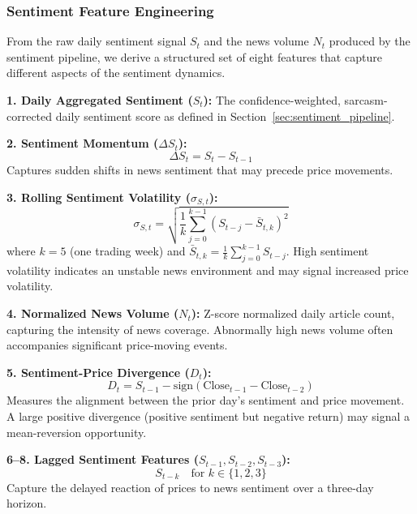 \documentclass[12pt,a4paper]{article}
\begin{document}
\subsubsection{Sentiment Feature Engineering}
\label{sec:sentiment_features}

From the raw daily sentiment signal $S_t$ and the news volume $N_t$ produced by the sentiment pipeline, we derive a structured set of eight features that capture different aspects of the sentiment dynamics.

\textbf{1. Daily Aggregated Sentiment ($S_t$):}
The confidence-weighted, sarcasm-corrected daily sentiment score as defined in Section~\ref{sec:sentiment_pipeline}.

\textbf{2. Sentiment Momentum ($\Delta S_t$):}
\begin{equation}
\Delta S_t = S_t - S_{t-1}
\end{equation}
Captures sudden shifts in news sentiment that may precede price movements.

\textbf{3. Rolling Sentiment Volatility ($\sigma_{S,t}$):}
\begin{equation}
\sigma_{S,t} = \sqrt{\frac{1}{k} \sum_{j=0}^{k-1} \left(S_{t-j} - \bar{S}_{t,k}\right)^2}
\end{equation}
where $k = 5$ (one trading week) and $\bar{S}_{t,k} = \frac{1}{k}\sum_{j=0}^{k-1} S_{t-j}$. High sentiment volatility indicates an unstable news environment and may signal increased price volatility.

\textbf{4. Normalized News Volume ($N_t$):}
Z-score normalized daily article count, capturing the intensity of news coverage. Abnormally high news volume often accompanies significant price-moving events.

\textbf{5. Sentiment-Price Divergence ($D_t$):}
\begin{equation}
D_t = S_{t-1} - \text{sign}\left(\text{Close}_{t-1} - \text{Close}_{t-2}\right)
\end{equation}
Measures the alignment between the prior day's sentiment and price movement. A large positive divergence (positive sentiment but negative return) may signal a mean-reversion opportunity.

\textbf{6--8. Lagged Sentiment Features ($S_{t-1}, S_{t-2}, S_{t-3}$):}
\begin{equation}
S_{t-k} \quad \text{for } k \in \{1, 2, 3\}
\end{equation}
Capture the delayed reaction of prices to news sentiment over a three-day horizon.
\end{document}
